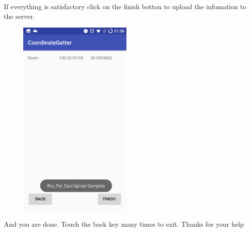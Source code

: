 \documentclass[fontsize=25pt]{scrbook}
\begin{document}
	If everything is satisfactory click on the finish botton to upload the infomation to the server.
	\begin{center}
\begin{figure}
		\includegraphics[height=10cm]{Screenshot_17.png}
		\end{figure}
	\end{center}
And you are done. Touch the back key many times to exit. Thanks for your help
\end{document}
